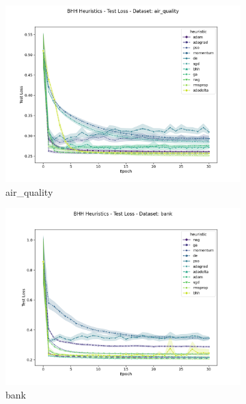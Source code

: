\begin{figure}[htbp]
	\begin{subfigure}{0.48\textwidth}
    	\centering
        \includegraphics[width=\textwidth]{analysis/standalone/figures/test/loss/air_quality.png}
        \caption{air\_quality}
        \label{fig:results:standalone:figures:test:loss:air_quality}
	\end{subfigure}
    \begin{subfigure}{0.48\textwidth}
    	\centering
        \includegraphics[width=\textwidth]{analysis/standalone/figures/test/loss/bank.png}
        \caption{bank}
        \label{fig:results:standalone:figures:test:loss:bank}
	\end{subfigure}
	\begin{subfigure}{0.48\textwidth}

\end{subfigure}
\end{figure}
